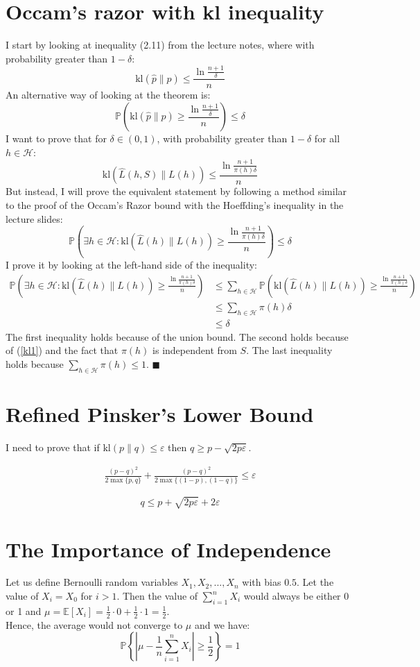 \documentclass[a4paper]{article}
\newcommand*{\QEDA}{\hfill\ensuremath{\blacksquare}}%
\begin{document}
\section{Occam’s razor with kl inequality}
I start by looking at inequality (2.11) from the lecture notes, where with
probability greater than $1-\delta$:
$$
\mathrm{kl}(\hat{p} \| p) \leq \frac{\ln \frac{n+1}{\delta}}{n}
$$
An alternative way of looking at the theorem is:
\begin{equation}\label{kl1}
\mathbb{P}(
\mathrm{kl}(\hat{p} \| p) \geq \frac{\ln \frac{n+1}{\delta}}{n}
) \leq \delta \tag{1}
\end{equation}
I want to prove that for $\delta \in(0,1)$, with probability greater than
$1-\delta$ for all $h \in \mathcal{H}$:
$$
\mathrm{kl}(\hat{L}(h, S) \| L(h)) \leq \frac{\ln \frac{n+1}{\pi(h) \delta}}{n}
$$
But instead, I will prove the equivalent statement by following a method similar
to the proof of the Occam's Razor bound with the Hoeffding's inequality in the
lecture slides:
$$
  \mathbb{P}(\exists h \in \mathcal{H} :
  \mathrm{kl}(\hat{L}(h) \| L(h)) \geq \frac{\ln \frac{n+1}{\pi(h)\delta}}{n})
  \leq \delta
$$
I prove it by looking at the left-hand side of the inequality:
\begin{align*}
  \mathbb{P}(\exists h \in \mathcal{H} :
  \mathrm{kl}(\hat{L}(h) \| L(h)) \geq \frac{\ln \frac{n+1}{\pi(h)\delta}}{n})
  &\leq
  \sum_{h \in \mathcal{H}}
  \mathbb{P} (\mathrm{kl}(\hat{L}(h) \| L(h)) \geq \frac{\ln \frac{n+1}{\pi(h)\delta}}{n})\\
  &\leq
  \sum_{h \in \mathcal{H}}\pi(h)\delta \\
  &\leq
  \delta
\end{align*}
The first inequality holds because of the union bound. The second 
holds because of (\ref{kl1}) and the fact that $\pi(h)$ is 
independent from $S$. The last inequality holds because 
$\sum_{h \in \mathcal{H}} \pi(h) \leq 1$. \QEDA

\section{Refined Pinsker’s Lower Bound}
I need to prove that if $\mathrm{kl}(p \| q) \leq \varepsilon$ then
$q \geq p-\sqrt{2 p \varepsilon}$. 

\begin{align*}
  \frac{(p-q)^{2}}{2 \max \{p, q\}}+\frac{(p-q)^{2}}{2 \max \{(1-p),(1-q)\}}
  \leq \varepsilon
\end{align*}

$$
q \leq p+\sqrt{2 p \varepsilon}+2 \varepsilon
$$
\section{The Importance of Independence}
Let us define Bernoulli random variables $X_1, X_2, ..., X_n$ with bias $0.5$.
Let the value of $X_i = X_0$ for $i>1$. Then the value of
$\sum_{i=1}^{n} X_{i}$ would always be either 0 or 1 and
$\mu = \mathbb{E}\left[X_{i}\right] = \frac{1}{2} \cdot 0 + \frac{1}{2} \cdot 1 = \frac{1}{2}$.\\
Hence, the average would not converge to $\mu$ and we have:
$$
\mathbb{P}\left\{\left|\mu-\frac{1}{n} \sum_{i=1}^{n} X_{i}\right| \geq \frac{1}{2}\right\}=1
$$
\end{document}
